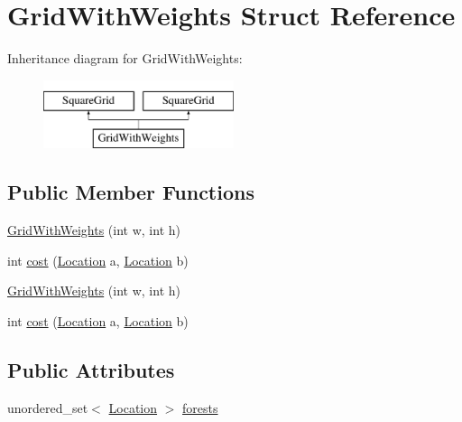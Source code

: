 \hypertarget{structGridWithWeights}{}\section{Grid\+With\+Weights Struct Reference}
\label{structGridWithWeights}
Inheritance diagram for Grid\+With\+Weights\+:\begin{figure}[H]
\begin{center}
\leavevmode
\includegraphics[height=2.000000cm]{structGridWithWeights}
\end{center}
\end{figure}
\subsection*{Public Member Functions}
\begin{DoxyCompactItemize}
\item 
\mbox{\hyperlink{structGridWithWeights_ad9eb67bf93deb3409ecf658288bc78f6}{Grid\+With\+Weights}} (int w, int h)
\item 
int \mbox{\hyperlink{structGridWithWeights_a999c39922a9b507e4436b817592a7ff9}{cost}} (\mbox{\hyperlink{structSquareGrid_a2c9a2cbd3912aa48ac97289abc3f1c0f}{Location}} a, \mbox{\hyperlink{structSquareGrid_a2c9a2cbd3912aa48ac97289abc3f1c0f}{Location}} b)
\item 
\mbox{\hyperlink{structGridWithWeights_ad9eb67bf93deb3409ecf658288bc78f6}{Grid\+With\+Weights}} (int w, int h)
\item 
int \mbox{\hyperlink{structGridWithWeights_a999c39922a9b507e4436b817592a7ff9}{cost}} (\mbox{\hyperlink{structSquareGrid_a2c9a2cbd3912aa48ac97289abc3f1c0f}{Location}} a, \mbox{\hyperlink{structSquareGrid_a2c9a2cbd3912aa48ac97289abc3f1c0f}{Location}} b)
\end{DoxyCompactItemize}
\subsection*{Public Attributes}
\begin{DoxyCompactItemize}
\item 
unordered\+\_\+set$<$ \mbox{\hyperlink{structSquareGrid_a2c9a2cbd3912aa48ac97289abc3f1c0f}{Location}} $>$ \mbox{\hyperlink{structGridWithWeights_a03137c824b8c63cdeed414ef40f5b504}{forests}}
\end{DoxyCompactItemize}
